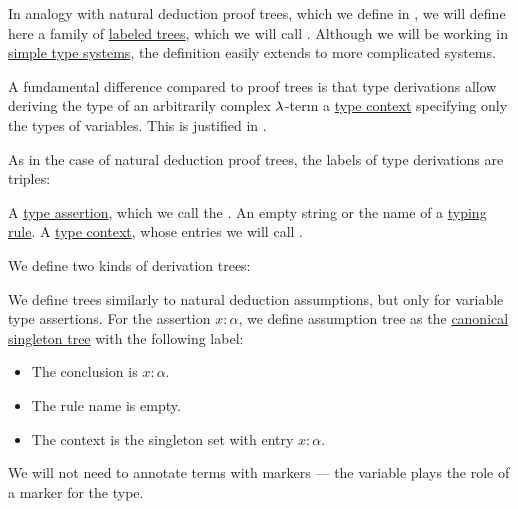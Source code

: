 \begin{definition}\label{def:type_derivation_tree}\mimprovised
  In analogy with natural deduction proof trees, which we define in , we will define here a family of \hyperref[def:labeled_tree]{labeled trees}, which we will call . Although we will be working in \hyperref[def:simple_type_system]{simple type systems}, the definition easily extends to more complicated systems.

  A fundamental difference compared to proof trees is that type derivations allow deriving the type of an arbitrarily complex \( \mathrm{\lambda} \)-term a \hyperref[def:type_context]{type context} specifying only the types of variables. This is justified in .

  As in the case of natural deduction proof trees, the labels of type derivations are triples:
  \begin{thmenum}[series=def:type_derivation_tree]
     A \hyperref[def:type_assertion]{type assertion}, which we call the .
     An empty string or the name of a \hyperref[def:simple_typing_rule]{typing rule}.
     A \hyperref[def:type_context]{type context}, whose entries we will call .
  \end{thmenum}

  We define two kinds of derivation trees:
  \begin{thmenum}[resume=def:type_derivation_tree]
     We define  trees similarly to natural deduction assumptions, but only for variable type assertions. For the assertion \( x: \alpha \), we define assumption tree as the \hyperref[def:canonical_singleton_tree]{canonical singleton tree} with the following label:
    \begin{itemize}
      \item The conclusion is \( x: \alpha \).
      \item The rule name is empty.
      \item The context is the singleton set with entry \( x: \alpha \).
    \end{itemize}

    We will not need to annotate terms with markers --- the variable plays the role of a marker for the type.


\end{thmenum}
\end{definition}
